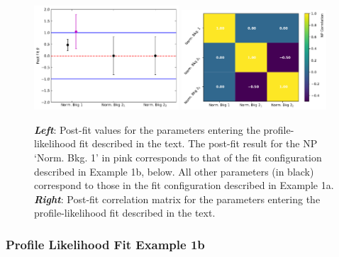 \begin{figure}[!htb]
    \begin{center}
        \includegraphics[width=0.48\textwidth]{figures/common_ana/stat_hypo/profile_examples/profile_ex_1_pulls}
        \includegraphics[width=0.48\textwidth]{figures/common_ana/stat_hypo/profile_examples/np_corr_ex_1}
        \caption{
            \textbf{\textit{Left}}: Post-fit values for the parameters entering the profile-likelihood fit
                described in the text. The post-fit result for the NP `Norm. Bkg. 1' in pink corresponds
                to that of the fit configuration described in Example 1b, below.
                All other parameters (in black) correspond to those in the fit configuration described in Example 1a.
            \textbf{\textit{Right}}: Post-fit correlation matrix for the parameters entering the profile-likelihood
                fit described in the text.
        }
        \label{fig:prof_ex_1_pulls}
    \end{center}
\end{figure}

\subsubsection{Profile Likelihood Fit Example 1b}
\label{sec:profiling_example_1b}

